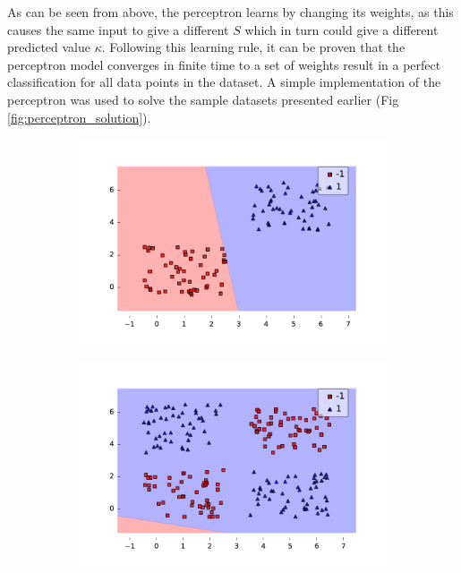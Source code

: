 As can be seen from above, the perceptron learns by changing its weights, as this causes the same input to give a different $S$ which in turn could give a different predicted value $\kappa$. Following this learning rule, it can be proven that the perceptron model converges in finite time to a set of weights result in a perfect classification for all data points in the dataset. A simple implementation of the perceptron was used to solve the sample datasets presented earlier (Fig \ref{fig:perceptron_solution}).

\begin{figure}[!h]
  \centering
  \begin{subfigure}{.49\textwidth}
    \centering
    \includegraphics[width=\linewidth]{figures/perceptron_solvable.pdf}
  \end{subfigure} %
  \begin{subfigure}{0.49\textwidth}
    \centering
    \includegraphics[width=\linewidth]{figures/perceptron_non_solvable.pdf}

\end{subfigure}
\end{figure}
